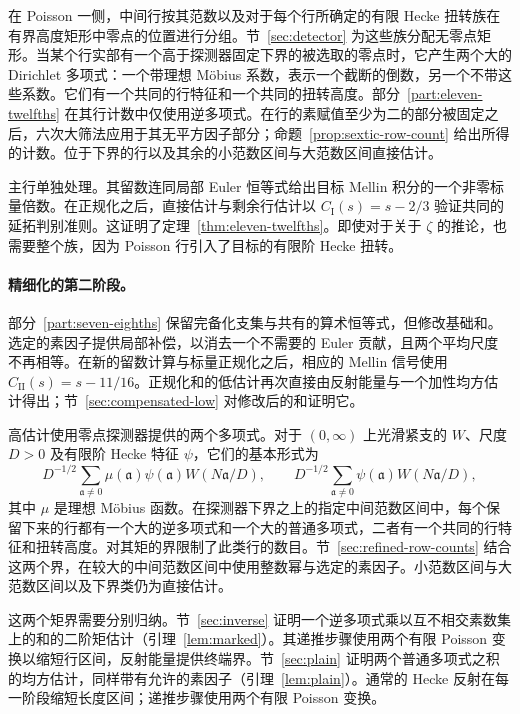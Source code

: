 在 Poisson 一侧，中间行按其范数以及对于每个行所确定的有限 Hecke 扭转族在有界高度矩形中零点的位置进行分组。节~\ref{sec:detector} 为这些族分配无零点矩形。当某个行实部有一个高于探测器固定下界的被选取的零点时，它产生两个大的 Dirichlet 多项式：一个带理想 M\"obius 系数，表示一个截断的倒数，另一个不带这些系数。它们有一个共同的行特征和一个共同的扭转高度。部分~\ref{part:eleven-twelfths} 在其行计数中仅使用逆多项式。在行的素赋值至少为二的部分被固定之后，六次大筛法应用于其无平方因子部分；命题~\ref{prop:sextic-row-count} 给出所得的计数。位于下界的行以及其余的小范数区间与大范数区间直接估计。

主行单独处理。其留数连同局部 Euler 恒等式给出目标 Mellin 积分的一个非零标量倍数。在正规化之后，直接估计与剩余行估计以 $C_{\mathrm I}(s)=s-2/3$ 验证共同的延拓判别准则。这证明了定理~\ref{thm:eleven-twelfths}。即使对于关于 $\zeta$ 的推论，也需要整个族，因为 Poisson 行引入了目标的有限阶 Hecke 扭转。

\paragraph{精细化的第二阶段。}
部分~\ref{part:seven-eighths} 保留完备化支集与共有的算术恒等式，但修改基础和。选定的素因子提供局部补偿，以消去一个不需要的 Euler 贡献，且两个平均尺度不再相等。在新的留数计算与标量正规化之后，相应的 Mellin 信号使用 $C_{\mathrm{II}}(s)=s-11/16$。正规化和的低估计再次直接由反射能量与一个加性均方估计得出；节~\ref{sec:compensated-low} 对修改后的和证明它。

高估计使用零点探测器提供的两个多项式。对于 $(0,\infty)$ 上光滑紧支的 $W$、尺度 $D>0$ 及有限阶 Hecke 特征 $\psi$，它们的基本形式为
\[
 D^{-1/2}\sum_{\mathfrak a\ne0}\mu(\mathfrak a)\psi(\mathfrak a)
       W(N\mathfrak a/D),\qquad
 D^{-1/2}\sum_{\mathfrak a\ne0}\psi(\mathfrak a)W(N\mathfrak a/D),
\]
其中 $\mu$ 是理想 M\"obius 函数。在探测器下界之上的指定中间范数区间中，每个保留下来的行都有一个大的逆多项式和一个大的普通多项式，二者有一个共同的行特征和扭转高度。对其矩的界限制了此类行的数目。节~\ref{sec:refined-row-counts} 结合这两个界，在较大的中间范数区间中使用整数幂与选定的素因子。小范数区间与大范数区间以及下界类仍为直接估计。

这两个矩界需要分别归纳。节~\ref{sec:inverse} 证明一个逆多项式乘以互不相交素数集上的和的二阶矩估计（引理~\ref{lem:marked}）。其递推步骤使用两个有限 Poisson 变换以缩短行区间，反射能量提供终端界。节~\ref{sec:plain} 证明两个普通多项式之积的均方估计，同样带有允许的素因子（引理~\ref{lem:plain}）。通常的 Hecke 反射在每一阶段缩短长度区间；递推步骤使用两个有限 Poisson 变换。


